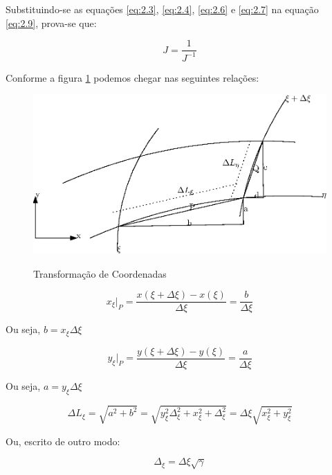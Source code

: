 Substituindo-se as equações \ref{eq:2.3}, \ref{eq:2.4}, \ref{eq:2.6} e \ref{eq:2.7} na equação \ref{eq:2.9}, prova-se que:

\begin{equation}
    \label{eq:2.10}
    J = \frac{1}{J^{-1}}
\end{equation}

Conforme a figura \ref{fig:transformacao} podemos chegar nas seguintes relações:
\begin{figure}[]
    \centering
    \includegraphics{fig/transformacao.eps}
    \label{fig:transformacao}
    \caption{Transformação de Coordenadas}
\end{figure}

\begin{equation*}
    x_\xi \vert_P = \frac{x(\xi+\Delta \xi)-x(\xi)}{\Delta \xi} = \frac{b}{\Delta \xi}
\end{equation*}

Ou seja, $b=x_\xi \Delta \xi$

\begin{equation*}
    y_\xi \vert_P = \frac{y(\xi+\Delta \xi)-y(\xi)}{\Delta \xi} = \frac{a}{\Delta \xi}    
\end{equation*}

Ou seja, $a=y_\xi \Delta \xi$

\begin{equation*}
    \Delta L_\xi = \sqrt{a^2+b^2} = \sqrt{y_\xi^2 \Delta_\xi^2 + x_\xi^2+\Delta_\xi^2} = \Delta \xi \sqrt{x_\xi^2 + y_\xi^2}
\end{equation*}

Ou, escrito de outro modo:

\begin{equation}
    \label{eq:2.11}
    \Delta_\xi = \Delta \xi \sqrt{\gamma}
\end{equation}

